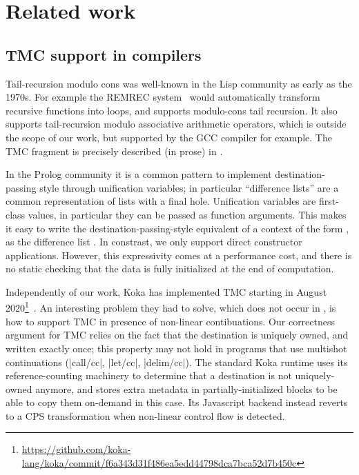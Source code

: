 \section{Related work}

\subsection{TMC support in compilers}

Tail-recursion modulo cons was well-known in the Lisp community as
early as the 1970s. For example the REMREC system~\citep*{risch-73}
would automatically transform recursive functions into loops, and
supports modulo-cons tail recursion. It also supports tail-recursion
modulo associative arithmetic operators, which is outside the scope
of our work, but supported by the GCC compiler for example. The TMC
fragment is precisely described (in prose) in \citet*{friedman-wise-75}.

In the Prolog community it is a common pattern to implement
destination-passing style through unification variables; in particular
``difference lists'' are a common representation of lists with a final
hole. Unification variables are first-class values, in particular they
can be passed as function arguments. This makes it easy to write the
destination-passing-style equivalent of a context of the form
, as the difference list
. In constrast, we only support direct
constructor applications. However, this expressivity comes at
a performance cost, and there is no static checking that the data is
fully initialized at the end of computation.

Independently of our work, Koka has implemented TMC starting in August
2020\footnote{\url{https://github.com/koka-lang/koka/commit/f6a343d31f486ea5edd44798dca7bca52d7b450c}}~\citep*{tmc-koka-2023}.
An interesting problem they had to solve, which does not occur in \OCaml,
is how to support TMC in presence of non-linear contibuations. Our
correctness argument for TMC relies on the fact that the destination
is uniquely owned, and written exactly once; this property may not
hold in programs that use multishot continuations (\ocaml|call/cc|,
\ocaml|let/cc|, \ocaml|delim/cc|). The standard Koka runtime uses its
reference-counting machinery to determine that a destination is not
uniquely-owned anymore, and stores extra metadata in
partially-initialized blocks to be able to copy them on-demand in this
case. Its Javascript backend instead reverts to a CPS transformation
when non-linear control flow is detected.

